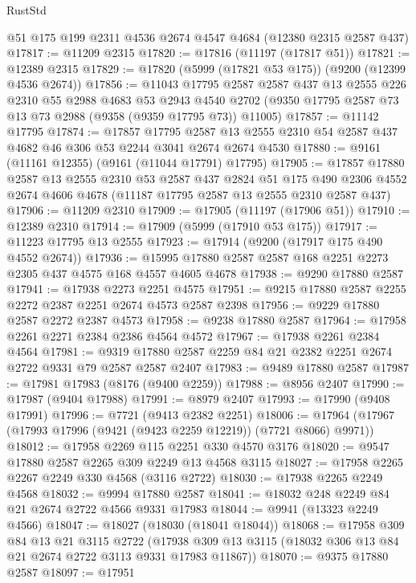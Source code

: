 \begin{lexlean}{RustStd}
\begin{coremodule}
    @51
    @175
    @199
    @2311
    @4536
    @2674
    @4547
    @4684
    (@12380 @2315 @2587 @437)
@17817 := @11209 @2315
@17820 := @17816 (@11197 (@17817 @51))
@17821 := @12389 @2315
@17829 := @17820 (@5999 (@17821 @53 @175)) (@9200 (@12399 @4536 @2674))
@17856 := @11043
    @17795
    @2587
    @2587
    @437
    @13
    @2555
    @226
    @2310
    @55
    @2988
    @4683
    @53
    @2943
    @4540
    @2702
    (@9350 @17795 @2587 @73 @13 @73 @2988 (@9358 (@9359 @17795 @73)) @11005)
@17857 := @11142 @17795
@17874 := @17857
    @17795
    @2587
    @13
    @2555
    @2310
    @54
    @2587
    @437
    @4682
    @46
    @306
    @53
    @2244
    @3041
    @2674
    @2674
    @4530
@17880 := @9161 (@11161 @12355) (@9161 (@11044 @17791) @17795)
@17905 := @17857
    @17880
    @2587
    @13
    @2555
    @2310
    @53
    @2587
    @437
    @2824
    @51
    @175
    @490
    @2306
    @4552
    @2674
    @4606
    @4678
    (@11187 @17795 @2587 @13 @2555 @2310 @2587 @437)
@17906 := @11209 @2310
@17909 := @17905 (@11197 (@17906 @51))
@17910 := @12389 @2310
@17914 := @17909 (@5999 (@17910 @53 @175))
@17917 := @11223 @17795 @13 @2555
@17923 := @17914 (@9200 (@17917 @175 @490 @4552 @2674))
@17936 := @15995 @17880 @2587 @2587 @168 @2251 @2273 @2305 @437 @4575 @168 @4557 @4605 @4678
@17938 := @9290 @17880 @2587
@17941 := @17938 @2273 @2251 @4575
@17951 := @9215 @17880 @2587 @2255 @2272 @2387 @2251 @2674 @4573 @2587 @2398
@17956 := @9229 @17880 @2587 @2272 @2387 @4573
@17958 := @9238 @17880 @2587
@17964 := @17958 @2261 @2271 @2384 @2386 @4564 @4572
@17967 := @17938 @2261 @2384 @4564
@17981 := @9319 @17880 @2587 @2259 @84 @21 @2382 @2251 @2674 @2722 @9331 @79 @2587 @2587 @2407
@17983 := @9489 @17880 @2587
@17987 := @17981 @17983 (@8176 (@9400 @2259))
@17988 := @8956 @2407
@17990 := @17987 (@9404 @17988)
@17991 := @8979 @2407
@17993 := @17990 (@9408 @17991)
@17996 := @7721 (@9413 @2382 @2251)
@18006 := @17964 (@17967 (@17993 @17996 (@9421 (@9423 @2259 @12219)) (@7721 @8066) @9971))
@18012 := @17958 @2269 @115 @2251 @330 @4570 @3176
@18020 := @9547 @17880 @2587 @2265 @309 @2249 @13 @4568 @3115
@18027 := @17958 @2265 @2267 @2249 @330 @4568 (@3116 @2722)
@18030 := @17938 @2265 @2249 @4568
@18032 := @9994 @17880 @2587
@18041 := @18032 @248 @2249 @84 @21 @2674 @2722 @4566 @9331 @17983
@18044 := @9941 (@13323 @2249 @4566)
@18047 := @18027 (@18030 (@18041 @18044))
@18068 := @17958
    @309
    @84
    @13
    @21
    @3115
    @2722
    (@17938 @309 @13 @3115 (@18032 @306 @13 @84 @21 @2674 @2722 @3113 @9331 @17983 @11867))
@18070 := @9375 @17880 @2587
@18097 := @17951

\end{coremodule}
\end{lexlean}
